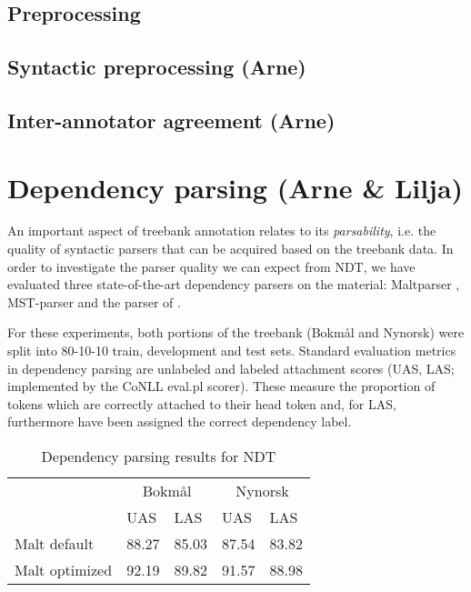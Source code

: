 \documentclass[11pt,a4paper]{article}
\begin{document}
\subsection{Preprocessing}
\subsection{Syntactic preprocessing (Arne)}

\subsection{Inter-annotator agreement (Arne)}

\section{Dependency parsing (Arne \& Lilja)}
An important aspect of treebank annotation relates to its \emph{parsability},
i.e. the quality of syntactic parsers that can be acquired based on
the treebank data.  In order to investigate the parser quality we can
expect from NDT, we have evaluated three state-of-the-art dependency
parsers on the material: Maltparser ,
MST-parser  and the parser of
.  

For these experiments, both portions of the treebank (Bokm{\aa}l and
Nynorsk) were split into 80-10-10 train, development and test sets.
Standard evaluation metrics in dependency parsing are unlabeled and
labeled attachment scores (UAS, LAS; implemented by the CoNLL
\textsf{eval.pl} scorer).  These measure the proportion of tokens
which are correctly attached to their head token and, for LAS,
furthermore have been assigned the correct dependency label.



\begin{table}
\centering
\begin{tabular}{lll|ll}
\hline
& \multicolumn{2}{c}{Bokm{\aa}l} & \multicolumn{2}{c}{Nynorsk}\\
 & UAS & LAS  & UAS & LAS \\\hline
Malt default & 88.27 & 85.03 & 87.54 & 83.82\\
Malt optimized & 92.19 & 89.82 & 91.57 & 88.98\\\hline
\end{tabular}
\caption{Dependency parsing results for NDT}
  \label{tb:parsing}
\end{table}
\end{document}
